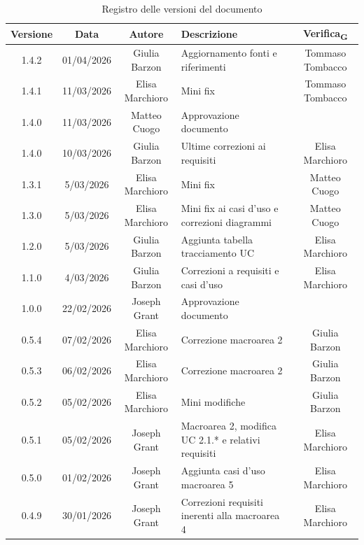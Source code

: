 \documentclass[11pt,a4paper]{article}
\newcommand{\gls}[1]{#1\textsubscript{G}}
\begin{document}
\begin{longtable}[H]{|c|c|c|>{\raggedright\arraybackslash}p{}|c|}
    \caption{Registro delle versioni del documento}
    \label{tab:versionamento} \\
        \hline
        \textbf{Versione} & \textbf{Data} & \textbf{Autore} & \textbf{Descrizione} & \textbf{\gls{Verifica}} \\
        \hline
        1.4.2 & 01/04/2026 & Giulia Barzon & Aggiornamento fonti e riferimenti & Tommaso Tombacco \\
        \hline
        1.4.1 & 11/03/2026 & Elisa Marchioro & Mini fix & Tommaso Tombacco \\
        \hline
        1.4.0 & 11/03/2026 & Matteo Cuogo & Approvazione documento & \\
        \hline
        1.4.0 & 10/03/2026 & Giulia Barzon & Ultime correzioni ai requisiti & Elisa Marchioro \\
        \hline
        1.3.1 & 5/03/2026 & Elisa Marchioro & Mini fix & Matteo Cuogo\\
        \hline
        1.3.0 & 5/03/2026 & Elisa Marchioro & Mini fix ai casi d'uso e correzioni diagrammi & Matteo Cuogo\\
        \hline
        1.2.0 & 5/03/2026 & Giulia Barzon & Aggiunta tabella tracciamento UC & Elisa Marchioro\\
        \hline
        1.1.0 & 4/03/2026 & Giulia Barzon & Correzioni a requisiti e casi d'uso & Elisa Marchioro\\
        \hline
        1.0.0 & 22/02/2026 & Joseph Grant & Approvazione documento & \\
        \hline
        0.5.4 & 07/02/2026 & Elisa Marchioro & Correzione macroarea 2 & Giulia Barzon\\
        \hline
        0.5.3 & 06/02/2026 & Elisa Marchioro & Correzione macroarea 2 & Giulia Barzon\\
        \hline
        0.5.2 & 05/02/2026 & Elisa Marchioro & Mini modifiche & Giulia Barzon\\
        \hline
        0.5.1 & 05/02/2026 & Joseph Grant & Macroarea 2, modifica UC 2.1.* e relativi requisiti & Elisa Marchioro\\
        \hline
        0.5.0 & 01/02/2026 & Joseph Grant & Aggiunta casi d'uso macroarea 5 & Elisa Marchioro\\
        \hline
        0.4.9 & 30/01/2026 & Joseph Grant & Correzioni requisiti inerenti alla macroarea 4 & Elisa Marchioro\\

\end{longtable}
\end{document}
